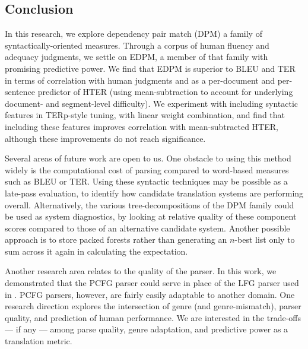 \documentclass{kluwer}    %
\begin{document}
\begin{article}
\section{Conclusion}
\label{sec:conclusion}
In this research, we explore dependency pair match (DPM) a family of
syntactically-oriented measures.  Through a corpus of human fluency
and adequacy judgments,
we settle on EDPM, a member of that family with promising predictive
power.  We find that EDPM is superior to BLEU and TER in terms of
correlation with human judgments and as a per-document and
per-sentence predictor of HTER (using mean-subtraction to account for
underlying document- and segment-level difficulty).
We experiment with including syntactic features in TERp-style tuning,
with linear weight combination, and find that including these features
improves correlation with mean-subtracted HTER, although these
improvements do not reach significance.

Several areas of future work are open to us. One obstacle to using
this method widely is the computational cost of parsing compared to
word-based measures
such as BLEU or TER.  Using these syntactic techniques may be possible
as a late-pass evaluation, to identify how candidate translation
systems are performing overall.  Alternatively, the various
tree-decompositions of the DPM family could be used as system
diagnostics, by looking at relative quality of these component scores
compared to those of an alternative candidate system.
%
Another possible approach is to store packed forests
\cite{huang08packedforests} rather than generating an $n$-best list
only to sum across it again in calculating the expectation.

Another research area relates to the quality of the parser.  In
this work, we demonstrated that the
 PCFG parser could serve in
place of the LFG parser used in
. PCFG parsers, however, are
fairly easily adaptable to another domain. One research
direction explores the intersection of genre (and genre-mismatch),
parser quality, and prediction of human performance.
We are interested in the trade-offs --- if any --- among parse
quality, genre adaptation, and predictive power as a translation metric.  


\acknowledgements


\end{article}
\end{document}
